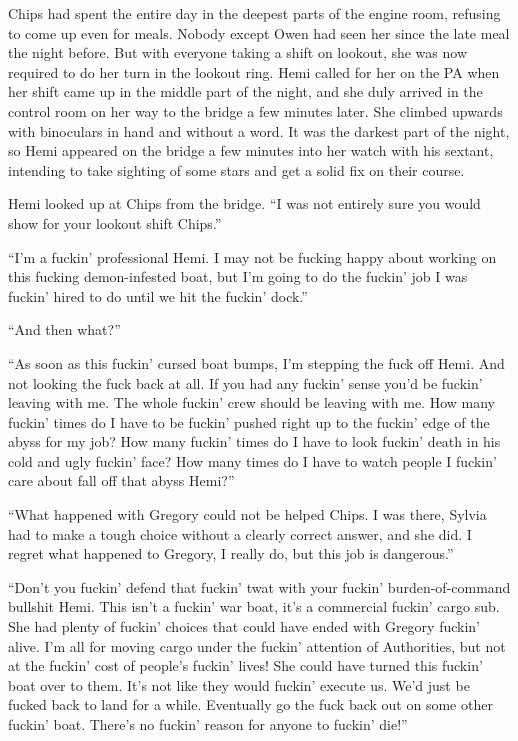 \documentclass[
]{scrbook}
\begin{document}
Chips had spent the entire day in the deepest parts of the engine room,
refusing to come up even for meals. Nobody except Owen had seen her
since the late meal the night before. But with everyone taking a shift
on lookout, she was now required to do her turn in the lookout ring.
Hemi called for her on the PA when her shift came up in the middle part
of the night, and she duly arrived in the control room on her way to the
bridge a few minutes later. She climbed upwards with binoculars in hand
and without a word. It was the darkest part of the night, so Hemi
appeared on the bridge a few minutes into her watch with his sextant,
intending to take sighting of some stars and get a solid fix on their
course.

Hemi looked up at Chips from the bridge. ``I was not entirely sure you
would show for your lookout shift Chips.''

``I'm a fuckin' professional Hemi. I may not be fucking happy about
working on this fucking demon-infested boat, but I'm going to do the
fuckin' job I was fuckin' hired to do until we hit the fuckin' dock.''

``And then what?''

``As soon as this fuckin' cursed boat bumps, I'm stepping the fuck off
Hemi. And not looking the fuck back at all. If you had any fuckin' sense
you'd be fuckin' leaving with me. The whole fuckin' crew should be
leaving with me. How many fuckin' times do I have to be fuckin' pushed
right up to the fuckin' edge of the abyss for my job? How many fuckin'
times do I have to look fuckin' death in his cold and ugly fuckin' face?
How many times do I have to watch people I fuckin' care about fall off
that abyss Hemi?''

``What happened with Gregory could not be helped Chips. I was there,
Sylvia had to make a tough choice without a clearly correct answer, and
she did. I regret what happened to Gregory, I really do, but this job is
dangerous.''

``Don't you fuckin' defend that fuckin' twat with your fuckin'
burden-of-command bullshit Hemi. This isn't a fuckin' war boat, it's a
commercial fuckin' cargo sub. She had plenty of fuckin' choices that
could have ended with Gregory fuckin' alive. I'm all for moving cargo
under the fuckin' attention of Authorities, but not at the fuckin' cost
of people's fuckin' lives! She could have turned this fuckin' boat over
to them. It's not like they would fuckin' execute us. We'd just be
fucked back to land for a while. Eventually go the fuck back out on some
other fuckin' boat. There's no fuckin' reason for anyone to fuckin'
die!''
\end{document}
